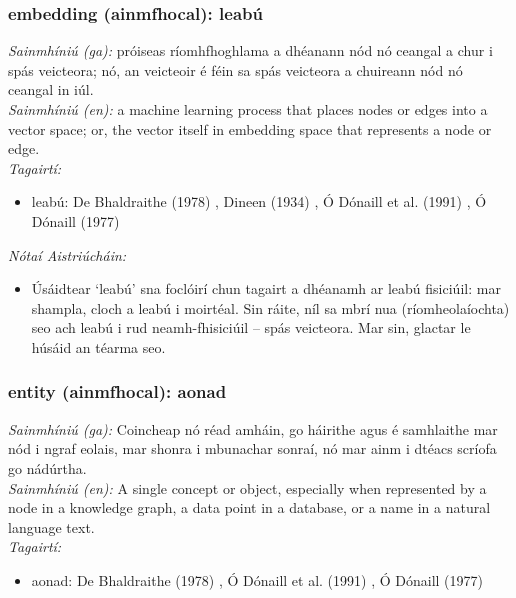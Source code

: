 \subsubsection*{embedding (ainmfhocal): leabú}
 \noindent \textit{Sainmhíniú (ga):} próiseas ríomhfhoghlama a dhéanann nód nó ceangal a chur i spás veicteora; nó, an veicteoir é féin sa spás veicteora a chuireann nód nó ceangal in iúl.
\\
 \noindent \textit{Sainmhíniú (en):} a machine learning process that places nodes or edges into a vector space; or, the vector itself in embedding space that represents a node or edge.
\\
 \noindent \textit{Tagairtí:}
\begin{itemize}
	\item leabú: De Bhaldraithe (1978) \cite{de-bhaldraithe}, Dineen (1934) \cite{dineen}, Ó Dónaill et al. (1991) \cite{focloir-beag}, Ó Dónaill (1977) \cite{odonaill}
\end{itemize}

 \noindent \textit{Nótaí Aistriúcháin:}
\begin{itemize}
	\item Úsáidtear `leabú' sna foclóirí chun tagairt a dhéanamh ar leabú fisiciúil: mar shampla, cloch a leabú i moirtéal. Sin ráite, níl sa mbrí nua (ríomheolaíochta) seo ach leabú i rud neamh-fhisiciúil -- spás veicteora. Mar sin, glactar le húsáid an téarma seo.
\end{itemize}


\subsubsection*{entity (ainmfhocal): aonad}
 \noindent \textit{Sainmhíniú (ga):} Coincheap nó réad amháin, go háirithe agus é samhlaithe mar nód i ngraf eolais, mar shonra i mbunachar sonraí, nó mar ainm i dtéacs scríofa go nádúrtha.
\\
 \noindent \textit{Sainmhíniú (en):} A single concept or object, especially when represented by a node in a knowledge graph, a data point in a database, or a name in a natural language text.
\\
 \noindent \textit{Tagairtí:}
\begin{itemize}
	\item aonad: De Bhaldraithe (1978) \cite{de-bhaldraithe}, Ó Dónaill et al. (1991) \cite{focloir-beag}, Ó Dónaill (1977) \cite{odonaill}
\end{itemize}

